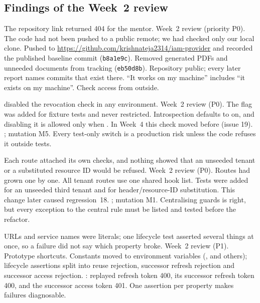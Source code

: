 \subsection{Findings of the Week~2 review}

{The repository link returned 404 for the mentor.}
{Week~2 review (priority P0).}
{The code had not been pushed to a public remote; we had checked only our local clone.}
{Pushed to \url{https://github.com/krishnateja2314/iam-provider} and recorded the published baseline commit (\texttt{b8a1e9c}). Removed generated PDFs and unneeded documents from tracking (\texttt{eb50d8b}).}
{Repository public; every later report names commits that exist there.}
{``It works on my machine'' includes ``it exists on my machine''. Check access from outside.}

{ disabled the revocation check in any environment.}
{Week~2 review (P0).}
{The flag was added for fixture tests and never restricted.}
{Introspection defaults to on, and disabling it is allowed only when . In Week~4 this check moved before  (issue 19).}
{; mutation M5.}
{Every test-only switch is a production risk unless the code refuses it outside tests.}

{Each route attached its own checks, and nothing showed that an unseeded tenant or a substituted resource ID would be refused.}
{Week~2 review (P0).}
{Routes had grown one by one.}
{All tenant routes use one shared hook list. Tests were added for an unseeded third tenant and for header/resource-ID substitution. This change later caused regression~18.}
{; mutation M1.}
{Centralising guards is right, but every exception to the central rule must be listed and tested before the refactor.}

{URLs and service names were literals; one lifecycle test asserted several things at once, so a failure did not say which property broke.}
{Week~2 review (P1).}
{Prototype shortcuts.}
{Constants moved to environment variables (,  and others); lifecycle assertions split into reuse rejection, successor refresh rejection and successor access rejection.}
{: replayed refresh token 400, its successor refresh token 400, and the successor access token 401.}
{One assertion per property makes failures diagnosable.}

